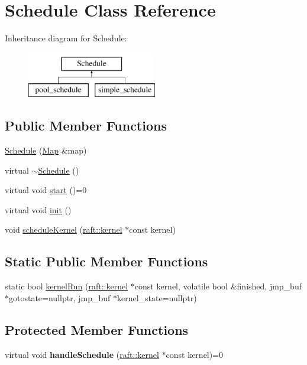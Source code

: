 \hypertarget{class_schedule}{}\section{Schedule Class Reference}
\label{class_schedule}
Inheritance diagram for Schedule\+:\begin{figure}[H]
\begin{center}
\leavevmode
\includegraphics[height=2.000000cm]{class_schedule}
\end{center}
\end{figure}
\subsection*{Public Member Functions}
\begin{DoxyCompactItemize}
\item 
\hyperlink{class_schedule_ad88c01f0ebf0c2f3bfa3ca2fe7ca3e8f}{Schedule} (\hyperlink{class_map}{Map} \&map)
\item 
virtual \hyperlink{class_schedule_a4806b985197d35c00b9e707c0ed87998}{$\sim$\+Schedule} ()
\item 
virtual void \hyperlink{class_schedule_ab6ad5540ecdef6b472b4e8242a47c4ee}{start} ()=0
\item 
virtual void \hyperlink{class_schedule_a5180032a0c2135507859ccf2a4eea1ab}{init} ()
\item 
void \hyperlink{class_schedule_a6a722f6e76c8b8dc67874d9974b6d641}{schedule\+Kernel} (\hyperlink{classraft_1_1kernel}{raft\+::kernel} $\ast$const kernel)
\end{DoxyCompactItemize}
\subsection*{Static Public Member Functions}
\begin{DoxyCompactItemize}
\item 
static bool \hyperlink{class_schedule_acf28b4a4231e693585751a035873615c}{kernel\+Run} (\hyperlink{classraft_1_1kernel}{raft\+::kernel} $\ast$const kernel, volatile bool \&finished, jmp\+\_\+buf $\ast$gotostate=nullptr, jmp\+\_\+buf $\ast$kernel\+\_\+state=nullptr)
\end{DoxyCompactItemize}
\subsection*{Protected Member Functions}
\begin{DoxyCompactItemize}
\item 
\hypertarget{class_schedule_addff3f2e72caab274963cc888faa2f6b}{}virtual void {\bfseries handle\+Schedule} (\hyperlink{classraft_1_1kernel}{raft\+::kernel} $\ast$const kernel)=0\label{class_schedule_addff3f2e72caab274963cc888faa2f6b}

\end{DoxyCompactItemize}
